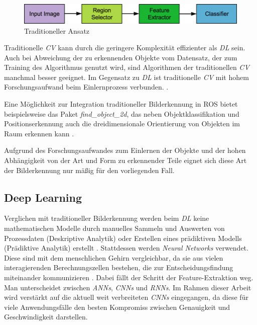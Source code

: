 \begin{figure}[ht]
    \centering
    \includegraphics[width=\textwidth]{Bilder/detection_traditional.png}
    \caption{Traditioneller Ansatz \cite[Abbildung~3]{youzi_review_2020}}
    \label{fig:detection_traditional}
\end{figure}

Traditionelle \textit{\ac{CV}} kann durch die geringere Komplexität effizienter als \textit{\ac{DL}} sein. Auch bei Abweichung der zu erkennenden Objekte vom Datensatz, der zum Training des Algorithmus genutzt wird, sind Algorithmen der traditionellen \textit{\ac{CV}} manchmal besser geeignet. Im Gegensatz zu \textit{\ac{DL}} ist traditionelle \textit{\ac{CV}} mit hohem Forschungsaufwand beim Einlernprozess verbunden. \cite[Absatz~2.3]{arai_deep_2020}.

Eine Möglichkeit zur Integration traditioneller Bilderkennung in \ac{ROS} bietet beispielsweise das Paket \textit{find\_object\_2d}, das neben Objektklassifikation und Positionserkennung auch die dreidimensionale Orientierung von Objekten im Raum erkennen kann \cite{labbe_find_2011}.

Aufgrund des Forschungsaufwandes zum Einlernen der Objekte und der hohen Abhängigkeit von der Art und Form zu erkennender Teile eignet sich diese Art der Bilderkennung nur mäßig für den vorliegenden Fall.

\subsection{Deep Learning}

Verglichen mit traditioneller Bilderkennung werden beim \textit{\ac{DL}} keine mathematischen Modelle durch manuelles Sammeln und Auswerten von Prozessdaten (Deskriptive Analytik) oder Erstellen eines prädiktiven Modells (Prädiktive Analytik) erstellt \cite[Kapitel~1]{bonaccorso_machine_2018}. Stattdessen werden \textit{Neural Networks} verwendet. Diese sind mit dem menschlichen Gehirn vergleichbar, da sie aus vielen interagierenden Berechnungszellen bestehen, die zur Entscheidungsfindung miteinander kommunizieren \cite[Kapitel~3~Abschnitt~B]{o_mahony_adaptive_2016}. Dabei fällt der Schritt der Feature-Extraktion weg. Man unterscheidet zwischen \textit{\acp{ANN}}, \textit{\acp{CNN}} und \textit{\acp{RNN}}. Im Rahmen dieser Arbeit wird verstärkt auf die aktuell weit verbreiteten \textit{\acp{CNN}} eingegangen, da diese für viele Anwendungsfälle den besten Kompromiss zwischen Genauigkeit und Geschwindigkeit darstellen.

